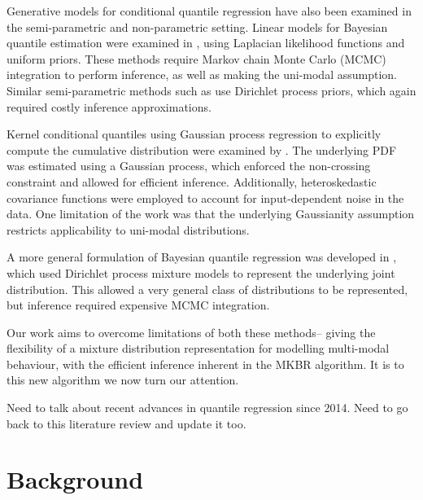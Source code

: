 \documentclass[twoside]{article} \usepackage{aistats2017}
\theoremstyle{definition}
\theoremstyle{remark}
\newcommand{\warn}[1]{{\color{RedOrange} #1}}
\begin{document}
	Generative models for conditional quantile regression have also been examined in the semi-parametric and non-parametric setting. Linear models for Bayesian quantile estimation were examined in \cite{Yu2001}, using Laplacian likelihood functions and uniform priors. These methods require Markov chain Monte Carlo (MCMC) integration to perform inference, as well as making the uni-modal assumption. Similar semi-parametric methods such as \cite{Hjort2006, Hjort2009} use Dirichlet process priors, which again required costly inference approximations.

	Kernel conditional quantiles using Gaussian process regression to explicitly compute the cumulative distribution were examined by \cite{Quadrianto2009}. The underlying PDF was estimated using a Gaussian process, which enforced the non-crossing constraint and allowed for efficient inference. Additionally, heteroskedastic covariance functions were employed to account for input-dependent noise in the data. One limitation of the work was that the underlying Gaussianity assumption restricts applicability to uni-modal distributions.

	A more general formulation of Bayesian quantile regression was developed in \cite{Taddy2010}, which used Dirichlet process mixture models to represent the underlying joint distribution. This allowed a very general class of distributions to be represented, but inference required expensive MCMC integration.



	Our work aims to overcome limitations of both these methods-- giving the flexibility of a mixture distribution representation for modelling multi-modal behaviour, with the efficient inference inherent in the MKBR algorithm. It is to this new algorithm we now turn our attention.

	\warn{Need to talk about recent advances in quantile regression since 2014. Need to go back to this literature review and update it too.}
	
\section{Background}
\label{sec:background}
	
\end{document}

